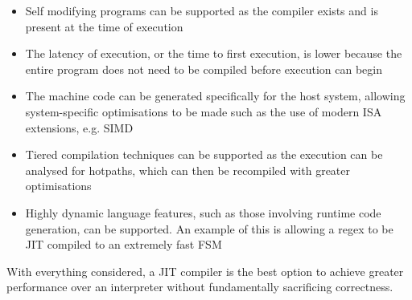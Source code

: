 \begin{itemize}
	\item Self modifying programs can be supported as the compiler exists and is present at the time of execution
	\item The latency of execution, or the time to first execution, is lower because the entire program does not need to be compiled before execution can begin
	\item The machine code can be generated specifically for the host system, allowing system-specific optimisations to be made such as the use of modern ISA extensions, e.g. SIMD
	\item Tiered compilation techniques can be supported as the execution can be analysed for hotpaths, which can then be recompiled with greater optimisations
	\item Highly dynamic language features, such as those involving runtime code generation, can be supported. An example of this is allowing a regex to be JIT compiled to an extremely fast FSM
\end{itemize}

With everything considered, a JIT compiler is the best option to achieve greater performance over an interpreter without fundamentally sacrificing correctness. 
